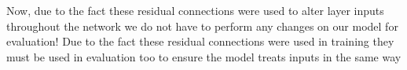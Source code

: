 {{Now, due to the fact these residual connections were used to alter layer inputs throughout the network we do not have to perform any changes on our model for evaluation! Due to the fact these residual connections were used in training they must be used in evaluation too to ensure the model treats inputs in the same way
}
}

